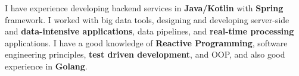 

\begin{cvparagraph}

I have experience developing backend services in \textbf{Java/Kotlin} with \textbf{Spring} framework.
I worked with big data tools, designing and developing server-side and \textbf{data-intensive applications}, data pipelines, and \textbf{real-time processing} applications.
I have a good knowledge of \textbf{Reactive Programming}, software engineering principles, \textbf{test driven development}, and OOP, and also good experience in \textbf{Golang}.
\end{cvparagraph}